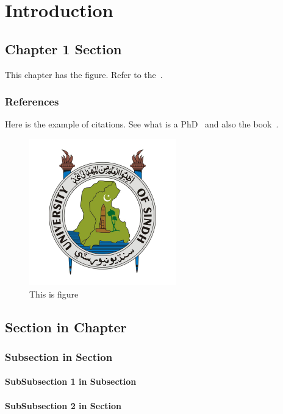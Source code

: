 \chapter{Introduction}

\section{Chapter 1 Section}

This chapter has the figure. Refer to the~.

\subsection{References}

Here is the example of citations. See what is a PhD~\cite{Might2010} and also the book~\cite{Popper2002}.

\begin{figure}
\centering
\includegraphics[width=2.5in]{settings/Logo-Colored.jpg}
\caption{This is figure}
\label{Fig::logo}
\end{figure}

\section{Section in Chapter}
\lipsum[1-1]

\subsection{Subsection in Section}
\lipsum[1-1]

\subsubsection{SubSubsection 1 in Subsection}
\lipsum[1-1]

\subsubsection{SubSubsection 2 in Section}
\lipsum[1-1]
